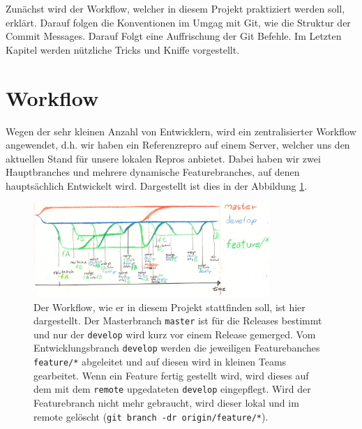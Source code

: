 \documentclass[
   draft=false
  ,paper=a4
  ,twoside=false
  ,fontsize=11pt
  ,headsepline
  ,DIV=11
  ,parskip=full+
  ,titlepage
]{scrartcl} %
\begin{document}
  Zunächst wird der Workflow, welcher in diesem Projekt 
  praktiziert werden soll, erklärt. Darauf folgen die Konventionen
  im Umgag mit Git, wie die Struktur der Commit Messages. Darauf 
  Folgt eine Auffrischung der Git Befehle. Im Letzten Kapitel werden
  nützliche Tricks und Kniffe vorgestellt.
	  
\newpage

\section{Workflow}
  Wegen der sehr kleinen Anzahl von Entwicklern, wird ein 
  zentralisierter Workflow angewendet, d.h. wir haben ein 
  Referenzrepro auf einem Server, welcher uns den aktuellen
  Stand für unsere lokalen Repros anbietet. Dabei haben wir 
  zwei Hauptbranches und mehrere dynamische Featurebranches, 
  auf denen hauptsächlich Entwickelt wird. Dargestellt ist dies
  in der Abbildung \ref{fig:workflow}. 
    
\begin{figure}[H]
  	\centering
    \includegraphics[width=0.8\textwidth]{./IMG/gitworkflow.png}
    \caption[workflow]{%
    Der Workflow, wie er in diesem Projekt 
    stattfinden soll, ist hier dargestellt. Der Masterbranch 
    \texttt{master} ist für die Releases bestimmt und nur der 
    \texttt{develop} wird kurz vor einem Release gemerged. 
    Vom Entwicklungsbranch
    \texttt{develop} werden die jeweiligen Featurebanches 
    \texttt{feature/*} abgeleitet und auf diesen wird in kleinen Teams 
    gearbeitet. Wenn ein Feature fertig gestellt wird, wird dieses auf dem
    mit dem \texttt{remote} upgedateten \texttt{develop} eingepflegt.
    Wird der Featurebranch nicht mehr gebraucht, wird dieser 
    lokal und im remote gelöscht (\texttt{git branch -dr origin/feature/*}).
    }%
    \label{fig:workflow}
\end{figure}
\end{document}
